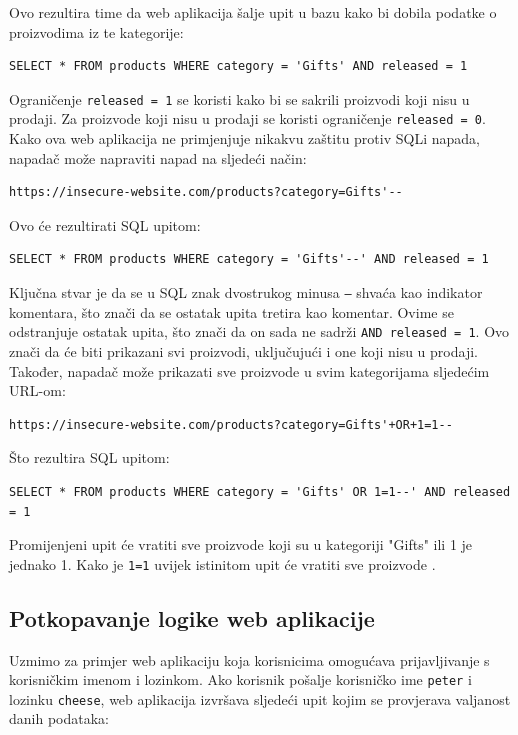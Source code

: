 \documentclass[12pt, oneside, onecolumn]{book}
\begin{document}
{Ovo rezultira time da web aplikacija šalje upit u bazu kako bi dobila podatke o proizvodima iz te kategorije:

\begin{verbatim}
SELECT * FROM products WHERE category = 'Gifts' AND released = 1
\end{verbatim}

Ograničenje \texttt{released = 1} se koristi kako bi se sakrili proizvodi koji nisu u prodaji. Za proizvode koji nisu u prodaji se koristi ograničenje \texttt{released = 0}. Kako ova web aplikacija ne primjenjuje nikakvu zaštitu protiv SQLi napada, napadač može napraviti napad na sljedeći način:

\begin{verbatim}
https://insecure-website.com/products?category=Gifts'--
\end{verbatim}

Ovo će rezultirati SQL upitom:

\begin{verbatim}
SELECT * FROM products WHERE category = 'Gifts'--' AND released = 1
\end{verbatim}

Ključna stvar je da se u SQL znak dvostrukog minusa \texttt{--} shvaća kao indikator komentara, što znači da se ostatak upita tretira kao komentar. Ovime se odstranjuje ostatak upita, što znači da on sada ne sadrži \texttt{AND released = 1}. Ovo znači da će biti prikazani svi proizvodi, uključujući i one koji nisu u prodaji. Također, napadač može prikazati sve proizvode u svim kategorijama sljedećim URL-om:

\begin{verbatim}
https://insecure-website.com/products?category=Gifts'+OR+1=1--
\end{verbatim}

Što rezultira SQL upitom:

\begin{verbatim}
SELECT * FROM products WHERE category = 'Gifts' OR 1=1--' AND released = 1
\end{verbatim}

Promijenjeni upit će vratiti sve proizvode koji su u kategoriji "Gifts" ili 1 je jednako 1. Kako je \texttt{1=1} uvijek istinitom upit će vratiti sve proizvode \cite{sitesqli}.

\subsection{Potkopavanje logike web aplikacije}
Uzmimo za primjer web aplikaciju koja korisnicima omogućava prijavljivanje s korisničkim imenom i lozinkom. Ako korisnik pošalje korisničko ime \texttt{peter} i lozinku \texttt{cheese}, web aplikacija izvršava sljedeći upit kojim se provjerava valjanost danih podataka:

}
\end{document}
